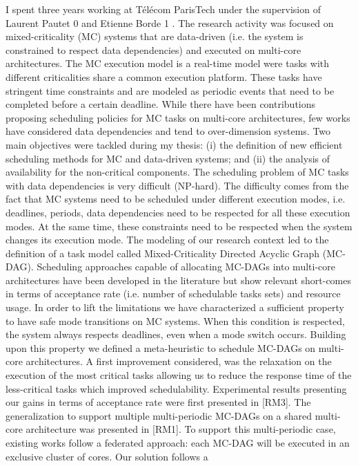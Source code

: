 \documentclass{article}
\begin{document}
I spent three years working at Télécom ParisTech under the supervision of Laurent Pautet 0 and Etienne 
Borde 1 . The
research activity was focused on mixed-criticality (MC) systems that are data-driven (i.e. the system is 
constrained to
respect data dependencies) and executed on multi-core architectures. The MC execution model is a 
real-time model were
tasks with different criticalities share a common execution platform. These tasks have stringent time 
constraints and are
modeled as periodic events that need to be completed before a certain deadline. While there have been 
contributions
proposing scheduling policies for MC tasks on multi-core architectures, few works have considered data 
dependencies
and tend to over-dimension systems. Two main objectives were tackled during my thesis: (i) the definition of 
new efficient
scheduling methods for MC and data-driven systems; and (ii) the analysis of availability for the non-critical 
components.
The scheduling problem of MC tasks with data dependencies is very difficult (NP-hard). The difficulty comes 
from the
fact that MC systems need to be scheduled under different execution modes, i.e. deadlines, periods, data 
dependencies
need to be respected for all these execution modes. At the same time, these constraints need to be respected 
when the
system changes its execution mode. The modeling of our research context led to the definition of a task 
model called
Mixed-Criticality Directed Acyclic Graph (MC-DAG). Scheduling approaches capable of allocating MC-DAGs 
into multi-core
architectures have been developed in the literature but show relevant short-comes in terms of acceptance 
rate (i.e. number
of schedulable tasks sets) and resource usage. In order to lift the limitations we have characterized a 
sufficient property to
have safe mode transitions on MC systems. When this condition is respected, the system always respects 
deadlines, even
when a mode switch occurs. Building upon this property we defined a meta-heuristic to schedule MC-DAGs 
on multi-core
architectures. A first improvement considered, was the relaxation on the execution of the most critical tasks 
allowing us to
reduce the response time of the less-critical tasks which improved schedulability. Experimental results 
presenting our gains
in terms of acceptance rate were first presented in [RM3]. The generalization to support multiple 
multi-periodic MC-DAGs
on a shared multi-core architecture was presented in [RM1]. To support this multi-periodic case, existing 
works follow a
federated approach: each MC-DAG will be executed in an exclusive cluster of cores. Our solution follows a 
\end{document}
